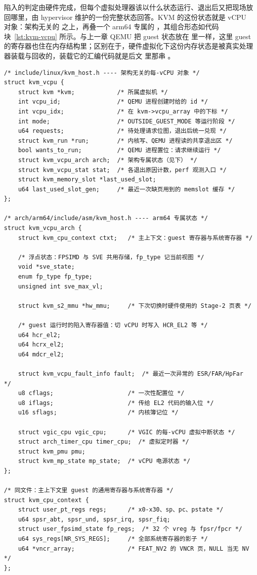 陷入的判定由硬件完成，但每个虚拟处理器该以什么状态运行、退出后又把现场放回哪里，由 hypervisor 维护的一份完整状态回答。KVM 的这份状态就是 vCPU 对象：架构无关的  之上，再叠一个 arm64 专属的 ，其组合形态如代码块~\ref{lst:kvm-vcpu} 所示。与上一章 QEMU 把 guest 状态放在  里一样，这里 guest 的寄存器也住在内存结构里；区别在于，硬件虚拟化下这份内存状态是被真实处理器装载与回收的，装载它的汇编代码就是后文  里那串 。

\begin{lstlisting}[caption={KVM vCPU 对象的组成：架构无关的 kvm\_vcpu 与 arm64 专属的 kvm\_vcpu\_arch（Linux 7.0，节选）},label={lst:kvm-vcpu}]
/* include/linux/kvm_host.h ---- 架构无关的每-vCPU 对象 */
struct kvm_vcpu {
    struct kvm *kvm;            /* 所属虚拟机 */
    int vcpu_id;                /* QEMU 进程创建时给的 id */
    int vcpu_idx;               /* 在 kvm->vcpu_array 中的下标 */
    int mode;                   /* OUTSIDE_GUEST_MODE 等运行阶段 */
    u64 requests;               /* 待处理请求位图，退出后统一兑现 */
    struct kvm_run *run;        /* 内核写、QEMU 进程读的共享退出区 */
    bool wants_to_run;          /* QEMU 进程置位：请求继续运行 */
    struct kvm_vcpu_arch arch;  /* 架构专属状态（见下） */
    struct kvm_vcpu_stat stat;  /* 各退出原因计数，perf 观测入口 */
    struct kvm_memory_slot *last_used_slot;
    u64 last_used_slot_gen;     /* 最近一次缺页用到的 memslot 缓存 */
};

/* arch/arm64/include/asm/kvm_host.h ---- arm64 专属状态 */
struct kvm_vcpu_arch {
    struct kvm_cpu_context ctxt;   /* 主上下文：guest 寄存器与系统寄存器 */

    /* 浮点状态：FPSIMD 与 SVE 共用存储，fp_type 记当前视图 */
    void *sve_state;
    enum fp_type fp_type;
    unsigned int sve_max_vl;

    struct kvm_s2_mmu *hw_mmu;     /* 下次切换时硬件使用的 Stage-2 页表 */

    /* guest 运行时的陷入寄存器值：切 vCPU 时写入 HCR_EL2 等 */
    u64 hcr_el2;
    u64 hcrx_el2;
    u64 mdcr_el2;

    struct kvm_vcpu_fault_info fault;  /* 最近一次异常的 ESR/FAR/HpFar */
    u8 cflags;                     /* 一次性配置位 */
    u8 iflags;                     /* 传给 EL2 代码的输入位 */
    u16 sflags;                    /* 内核簿记位 */

    struct vgic_cpu vgic_cpu;      /* VGIC 的每-vCPU 虚拟中断状态 */
    struct arch_timer_cpu timer_cpu;  /* 虚拟定时器 */
    struct kvm_pmu pmu;
    struct kvm_mp_state mp_state;  /* vCPU 电源状态 */
};

/* 同文件：主上下文里 guest 的通用寄存器与系统寄存器 */
struct kvm_cpu_context {
    struct user_pt_regs regs;      /* x0-x30、sp、pc、pstate */
    u64 spsr_abt, spsr_und, spsr_irq, spsr_fiq;
    struct user_fpsimd_state fp_regs;  /* 32 个 vreg 与 fpsr/fpcr */
    u64 sys_regs[NR_SYS_REGS];     /* 全部系统寄存器的影子 */
    u64 *vncr_array;               /* FEAT_NV2 的 VNCR 页，NULL 当无 NV */
};
\end{lstlisting}

